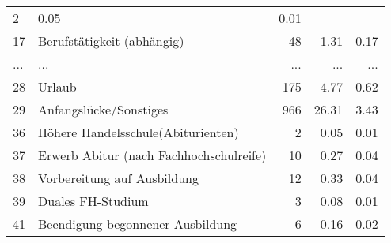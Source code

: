 \begin{longtable}{lXrrr}
          \num{2} &
          \num[round-mode=places,round-precision=2]{0,05} &
          \num[round-mode=places,round-precision=2]{0,01} \\
        17 & \multicolumn{1}{X}{Berufstätigkeit (abhängig)} & %
          \num{48} &
          \num[round-mode=places,round-precision=2]{1,31} &
          \num[round-mode=places,round-precision=2]{0,17} \\
       ... & ... & ... & ... & ... \\
        28 & \multicolumn{1}{X}{Urlaub} & %
          \num{175} &
          \num[round-mode=places,round-precision=2]{4,77} &
          \num[round-mode=places,round-precision=2]{0,62} \\

        29 & \multicolumn{1}{X}{Anfangslücke/Sonstiges} & %
          \num{966} &
          \num[round-mode=places,round-precision=2]{26,31} &
          \num[round-mode=places,round-precision=2]{3,43} \\

        36 & \multicolumn{1}{X}{Höhere Handelsschule(Abiturienten)} & %
          \num{2} &
          \num[round-mode=places,round-precision=2]{0,05} &
          \num[round-mode=places,round-precision=2]{0,01} \\

        37 & \multicolumn{1}{X}{Erwerb Abitur (nach Fachhochschulreife)} & %
          \num{10} &
          \num[round-mode=places,round-precision=2]{0,27} &
          \num[round-mode=places,round-precision=2]{0,04} \\

        38 & \multicolumn{1}{X}{Vorbereitung auf Ausbildung} & %
          \num{12} &
          \num[round-mode=places,round-precision=2]{0,33} &
          \num[round-mode=places,round-precision=2]{0,04} \\

        39 & \multicolumn{1}{X}{Duales FH-Studium} & %
          \num{3} &
          \num[round-mode=places,round-precision=2]{0,08} &
          \num[round-mode=places,round-precision=2]{0,01} \\

        41 & \multicolumn{1}{X}{Beendigung begonnener Ausbildung} & %
          \num{6} &
          \num[round-mode=places,round-precision=2]{0,16} &
          \num[round-mode=places,round-precision=2]{0,02} \\


\end{longtable}
